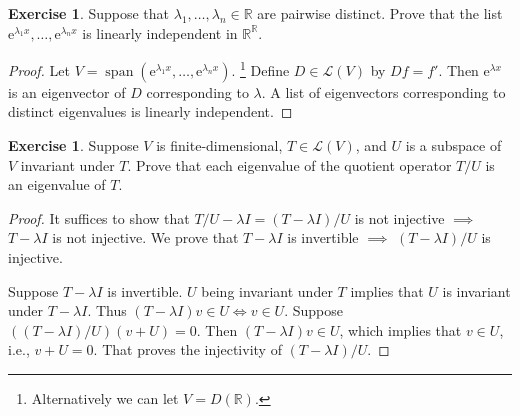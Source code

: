 \documentclass[nofonts,colorlinks]{tufte-handout}
\theoremstyle{plain} %
\theoremstyle{definition}
\newtheorem{defn}[thm]{Definition}
\newtheorem{exer}[thm]{Exercise}
\theoremstyle{remark}
\newcommand{\R}{\mathbb{R}}
\renewcommand{\L}{\mathcal{L}}
\newcommand{\e}{\mathrm{e}}
\DeclareMathOperator{\spn}{span}
\begin{document}

\begin{exer}
	Suppose that $\lambda_1,\dots,\lambda_n\in\R$ are pairwise distinct. Prove that the list $\e^{\lambda_1x},\dots,\e^{\lambda_nx}$ is linearly independent in $\R^\R$.
\end{exer}
\begin{proof}
	Let $V=\spn(\e^{\lambda_1x},\dots,\e^{\lambda_nx})$.%
	\footnote{Alternatively we can let $V=D(\R)$.}
	Define $D\in\L(V)$ by $Df=f'$. Then $\e^{\lambda x}$ is an eigenvector of $D$ corresponding to $\lambda$. A list of eigenvectors corresponding to distinct eigenvalues is linearly independent.
\end{proof}


\begin{exer}
	Suppose $V$ is finite-dimensional, $T\in\L(V)$, and $U$ is a subspace of $V$ invariant under $T$. Prove that each eigenvalue of the quotient operator $T/U$ is an eigenvalue of $T$.
\end{exer}
\begin{proof}
	It suffices to show that $T/U-\lambda I=(T-\lambda I)/U$ is not injective $\implies$ $T-\lambda I$ is not injective. We prove that $T-\lambda I$ is invertible $\implies$ $(T-\lambda I)/U$ is injective.

	Suppose $T-\lambda I$ is invertible. $U$ being invariant under $T$ implies that $U$ is invariant under $T-\lambda I$. Thus $(T-\lambda I)v\in U\iff v\in U$. Suppose $((T-\lambda I)/U)(v+U)=0$. Then $(T-\lambda I)v\in U$, which implies that $v\in U$, i.e., $v+U=0$. That proves the injectivity of $(T-\lambda I)/U$.
\end{proof}
\end{document}
